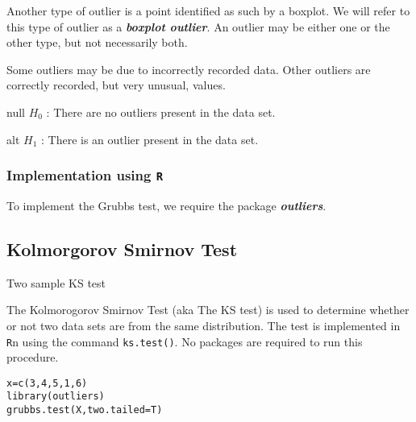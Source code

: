 \documentclass[12pt]{article} %
\begin{document}
Another type of outlier is a point identified as such by a boxplot. We will refer to this type of outlier as a \textbf{\textit{boxplot outlier}}.  An outlier may be either one or the other type, but not necessarily both.

Some outliers may be due to incorrectly recorded data. Other outliers are correctly recorded, but very unusual, values.

null $H_0$ : There are no outliers present in the data set.

alt $H_1$ : There is an outlier present in the data set.

\subsubsection{Implementation using \texttt{R}}
To implement the Grubbs test, we require the package \textbf{\textit{outliers}}.

\subsection{Kolmorgorov Smirnov Test}
Two sample KS test

The Kolmorogorov Smirnov Test (aka The KS test) is used to determine whether or not two data sets are from the same distribution.
The test is implemented in \texttt{R}n using the command \texttt{ks.test()}. No packages are required to run this procedure.




\begin{framed}
\begin{verbatim}
x=c(3,4,5,1,6)
library(outliers)
grubbs.test(X,two.tailed=T)
\end{verbatim}
\end{framed}
\newpage


\newpage

\newpage
\end{document}
